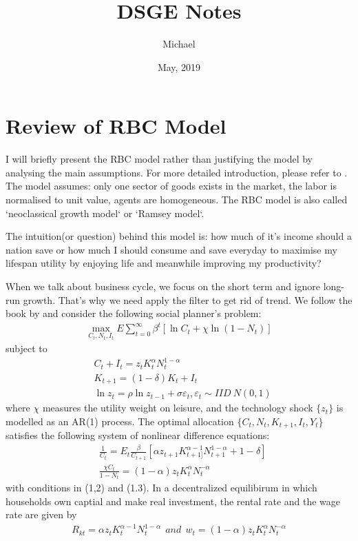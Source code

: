 \documentclass[12pt]{article}
\theoremstyle{definition}
\numberwithin{equation}{section}
\numberwithin{figure}{section}
\numberwithin{table}{section}
\begin{document}
\title{DSGE Notes}
\author{Michael}
\date{May, 2019}

\maketitle

\thispagestyle{empty}
\newpage

\section{Review of RBC Model}
\setcounter{page}{1}

I will briefly present the RBC model rather than justifying the model by analysing the main assumptions. For more detailed introduction, please refer to \cite{acemoglu2012introduction}. The model assumes: only one sector of goods exists in the market, the labor is normalised to unit value, agents are homogeneous. The RBC model is also called `neoclassical growth model` or `Ramsey model`.

The intuition(or question) behind this model is: how much of it's income should a nation save or how much I should consume and save everyday to maximise my lifespan utility by enjoying life and meanwhile improving my productivity?

When we talk about business cycle, we focus on the short term and ignore long-run growth. That's why we need apply the filter to get rid of trend. We follow the book by \cite{miao2014economic} and consider the following social planner's problem:
\begin{align}
  \max_{C_t, N_t, I_t} E \sum_{t=0}^\infty \beta^t [\ln C_t + \chi \ln (1 - N_t)]
\end{align}
subject to
\begin{align}
  & C_t + I_t = z_t K_t^\alpha N_t^{1-\alpha} \\
  & K_{t+1} = (1 - \delta) K_t + I_t \\
  & \ln z_t = \rho \ln z_{t-1} + \sigma \varepsilon_t, \varepsilon_t \sim IID \ N(0, 1)
\end{align}
where $\chi$ measures the utility weight on leisure, and the technology shock $\{ z_t \}$ is modelled as an AR(1) process. The optimal allocation $\{ C_t, N_t, K_{t+1}, I_t, Y_t \}$ satisfies the following system of nonlinear difference equations:
\begin{align}
  & \frac{1}{C_t} = E_t \frac{\beta}{C_{t+1}} [\alpha z_{t+1} K_{t+1]}^{\alpha - 1} N_{t+1}^{1-\alpha} + 1 - \delta] \\
  & \frac{\chi C_t}{1 - N_t} = (1 - \alpha) z_t K_t^\alpha N_t^{-\alpha}
\end{align}
with conditions in (1,2) and (1.3). In a decentralized equilibirum in which households own captial and make real investment, the rental rate and the wage rate are given by
\begin{align*}
  R_{kt} = \alpha z_t K_t^{\alpha - 1} N_t^{1-\alpha} \ \ and \ \ w_t = (1-\alpha) z_t K_t^\alpha N_t^{-\alpha}
\end{align*}
\end{document}
